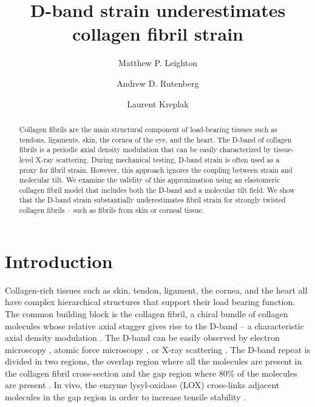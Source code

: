 \documentclass[preprint,12pt]{elsarticle}
\begin{document}
\begin{frontmatter}

\title{D-band strain underestimates collagen fibril strain}
\author[inst1,inst2]{Matthew P. Leighton}


\author[inst1]{Andrew D. Rutenberg}
\author[inst1]{Laurent Kreplak}


\begin{abstract}
Collagen fibrils are the main structural component of load-bearing tissues such as tendons, ligaments, skin, the cornea of the eye, and the heart. The D-band of collagen fibrils is a periodic axial density modulation that can be easily characterized by tissue-level X-ray scattering. During mechanical testing, D-band strain is often used as a proxy for fibril strain. However, this approach ignores the coupling between strain and molecular tilt. We examine the validity of this approximation using an elastomeric collagen fibril model that includes both the D-band and a molecular tilt field. We show that the D-band strain substantially underestimates fibril strain for strongly twisted collagen fibrils -- such as fibrils from skin or corneal tissue.
\end{abstract}

\end{frontmatter}


\section{Introduction}
\label{sec:intro}
Collagen-rich tissues such as skin, tendon, ligament, the cornea, and the heart all have complex hierarchical structures that support their load bearing function. The common building block is the collagen fibril, a chiral bundle of collagen molecules whose relative axial stagger gives rise to the D-band --  a characteristic axial density modulation \cite{Orgel:2006}. The D-band can be easily observed by electron microscopy \cite{Hodge:1960}, atomic force microscopy \cite{Fang:2013}, or X-ray scattering \cite{Sasaki:1996}. The D-band repeat is divided in two regions, the overlap region where all the molecules are present in the collagen fibril cross-section and the gap region where 80\% of the molecules are present \cite{Orgel:2006}. In vivo, the enzyme lysyl-oxidase (LOX) cross-links adjacent molecules in the gap region in order to increase tensile stability \cite{Orgel:2001,Makris:2014}. 
\end{document}
